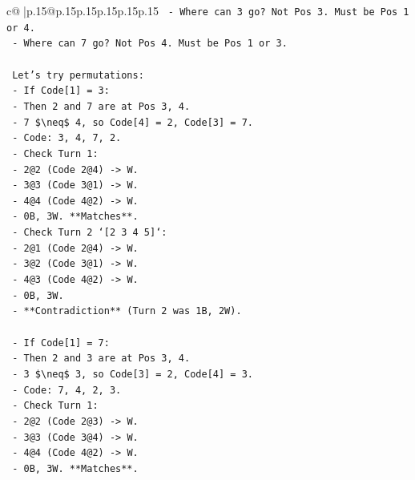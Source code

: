 \documentclass{article}
\begin{document}
{\begin{supertabular}{c@{$\;$}|p{.15\linewidth}@{}p{.15\linewidth}p{.15\linewidth}p{.15\linewidth}p{.15\linewidth}p{.15\linewidth}}
{{{\texttt{        {-} Where can 3 go? Not Pos 3. Must be Pos 1 or 4.} \\
\texttt{        {-} Where can 7 go? Not Pos 4. Must be Pos 1 or 3.} \\
\\ 
\texttt{        Let's try permutations:} \\
\texttt{        {-} If Code{[}1{]} = 3:} \\
\texttt{          {-} Then 2 and 7 are at Pos 3, 4.} \\
\texttt{          {-} 7 \$\textbackslash{}neq\$ 4, so Code{[}4{]} = 2, Code{[}3{]} = 7.} \\
\texttt{          {-} Code: 3, 4, 7, 2.} \\
\texttt{          {-} Check Turn 1:} \\
\texttt{            {-} 2@2 (Code 2@4) {-}> W.} \\
\texttt{            {-} 3@3 (Code 3@1) {-}> W.} \\
\texttt{            {-} 4@4 (Code 4@2) {-}> W.} \\
\texttt{            {-} 0B, 3W. **Matches**.} \\
\texttt{          {-} Check Turn 2 `{[}2 3 4 5{]}`:} \\
\texttt{            {-} 2@1 (Code 2@4) {-}> W.} \\
\texttt{            {-} 3@2 (Code 3@1) {-}> W.} \\
\texttt{            {-} 4@3 (Code 4@2) {-}> W.} \\
\texttt{            {-} 0B, 3W.} \\
\texttt{            {-} **Contradiction** (Turn 2 was 1B, 2W).} \\
\\ 
\texttt{        {-} If Code{[}1{]} = 7:} \\
\texttt{          {-} Then 2 and 3 are at Pos 3, 4.} \\
\texttt{          {-} 3 \$\textbackslash{}neq\$ 3, so Code{[}3{]} = 2, Code{[}4{]} = 3.} \\
\texttt{          {-} Code: 7, 4, 2, 3.} \\
\texttt{          {-} Check Turn 1:} \\
\texttt{            {-} 2@2 (Code 2@3) {-}> W.} \\
\texttt{            {-} 3@3 (Code 3@4) {-}> W.} \\
\texttt{            {-} 4@4 (Code 4@2) {-}> W.} \\
\texttt{            {-} 0B, 3W. **Matches**.} \\
}}}
\end{supertabular}}
\end{document}
